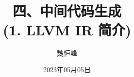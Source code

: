 \documentclass[]{beamer}
\title[中间代码生成]{四、中间代码生成 \\ (1. LLVM IR 简介)}
\author[魏恒峰]{\large 魏恒峰}
\institute{hfwei@nju.edu.cn}
\date{2023年05月05日}
\begin{document}
\maketitle




\thankyou{}

\end{document}
